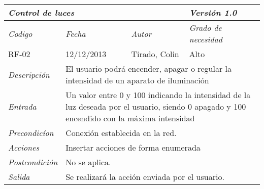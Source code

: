 \begin{tabular}{|p{3cm}|p{4cm}|p{4cm}|p{4cm}|}
\hline \multicolumn{3}{|p{9cm}|}{\textit{Control de luces}} & \textit{Versi\'on 1.0} \\
\hline \textit{Codigo} & \textit{Fecha} & \textit{Autor} & \textit{Grado de necesidad} \\
RF-02 & 12/12/2013 & Tirado, Colin & Alto \\
\hline \textit{Descripci\'on} & \multicolumn{3}{|p{9cm}|}{El usuario podr\'a encender, apagar o regular la intensidad de un aparato de iluminaci\'on} \\
\hline \textit{Entrada} & \multicolumn{3}{|p{9cm}|}{Un valor entre 0 y 100 indicando la intensidad de la luz deseada por el usuario, siendo 0 apagado y 100 encendido con la máxima intensidad } \\
\hline \textit{Precondic\'ion} & \multicolumn{3}{|p{9cm}|}{Conexi\'on establecida en la red.} \\
\hline \textit{Acciones} & \multicolumn{3}{|p{9cm}|}{Insertar acciones de forma enumerada} \\
\hline \textit{Postcondici\'on} & \multicolumn{3}{|p{9cm}|}{No se aplica.} \\
\hline \textit{Salida} & \multicolumn{3}{|p{9cm}|}{Se realizar\'a la acci\'on enviada por el usuario.} \\ \hline
\end{tabular}

